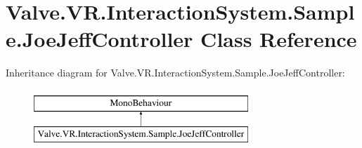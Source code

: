 \hypertarget{class_valve_1_1_v_r_1_1_interaction_system_1_1_sample_1_1_joe_jeff_controller}{}\section{Valve.\+V\+R.\+Interaction\+System.\+Sample.\+Joe\+Jeff\+Controller Class Reference}
\label{class_valve_1_1_v_r_1_1_interaction_system_1_1_sample_1_1_joe_jeff_controller}
Inheritance diagram for Valve.\+V\+R.\+Interaction\+System.\+Sample.\+Joe\+Jeff\+Controller\+:\begin{figure}[H]
\begin{center}
\leavevmode
\includegraphics[height=2.000000cm]{class_valve_1_1_v_r_1_1_interaction_system_1_1_sample_1_1_joe_jeff_controller}
\end{center}
\end{figure}

